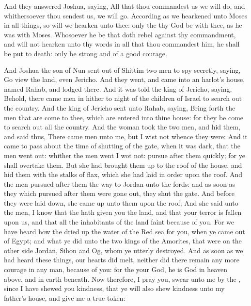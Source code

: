 \begin{biblechapter}
\verse And they answered Joshua, saying, All that thou commandest us we will do, and whithersoever thou sendest us, we will go.
\verse According as we hearkened unto Moses in all things, so will we hearken unto thee: only the \LORD thy God be with thee, as he was with Moses.
\verse Whosoever he be that doth rebel against thy commandment, and will not hearken unto thy words in all that thou commandest him, he shall be put to death: only be strong and of a good courage.
\end{biblechapter}

\begin{biblechapter} %
 And Joshua the son of Nun sent out of Shittim two men to spy secretly, saying, Go view the land, even Jericho. And they went, and came into an harlot's house, named Rahab, and lodged there.
\verse And it was told the king of Jericho, saying, Behold, there came men in hither to night of the children of Israel to search out the country.
\verse And the king of Jericho sent unto Rahab, saying, Bring forth the men that are come to thee, which are entered into thine house: for they be come to search out all the country.
\verse And the woman took the two men, and hid them, and said thus, There came men unto me, but I wist not whence they were:
\verse And it came to pass about the time of shutting of the gate, when it was dark, that the men went out: whither the men went I wot not: pursue after them quickly; for ye shall overtake them.
\verse But she had brought them up to the roof of the house, and hid them with the stalks of flax, which she had laid in order upon the roof.
\verse And the men pursued after them the way to Jordan unto the fords: and as soon as they which pursued after them were gone out, they shut the gate.
\verse And before they were laid down, she came up unto them upon the roof;
\verse And she said unto the men, I know that the \LORD hath given you the land, and that your terror is fallen upon us, and that all the inhabitants of the land faint because of you.
\verse For we have heard how the \LORD dried up the water of the Red sea for you, when ye came out of Egypt; and what ye did unto the two kings of the Amorites, that were on the other side Jordan, Sihon and Og, whom ye utterly destroyed.
\verse And as soon as we had heard these things, our hearts did melt, neither did there remain any more courage in any man, because of you: for the \LORD your God, he is God in heaven above, and in earth beneath.
\verse Now therefore, I pray you, swear unto me by the \LORD, since I have shewed you kindness, that ye will also shew kindness unto my father's house, and give me a true token:

\end{biblechapter}
